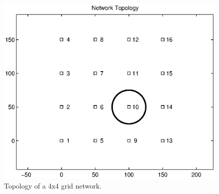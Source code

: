 \begin{figure}
\includegraphics[scale=.6]{figures/4x4topology}
\caption{Topology of a 4x4 grid network.}
\label{fig:4x4topology}
\end{figure}